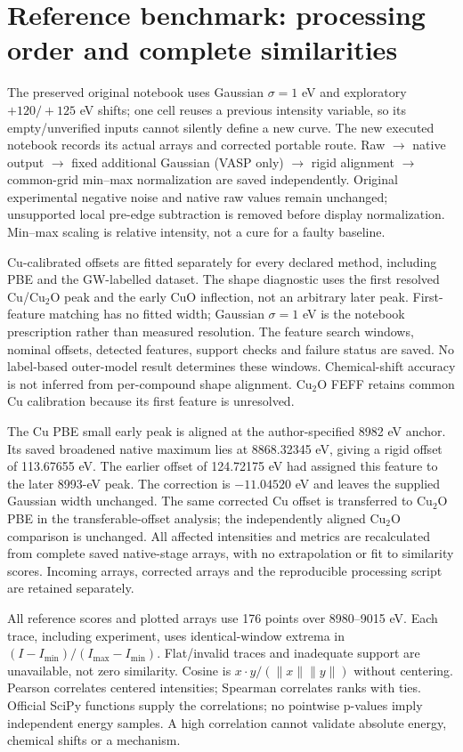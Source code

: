 \documentclass[11pt,a4paper]{article}
\begin{document}
\section{Reference benchmark: processing order and complete similarities}
The preserved original notebook uses Gaussian $\sigma=1$ eV and exploratory $+120/+125$ eV shifts; one cell reuses a previous intensity variable, so its empty/unverified inputs cannot silently define a new curve. The new executed notebook records its actual arrays and corrected portable route. Raw $\rightarrow$ native output $\rightarrow$ fixed additional Gaussian (VASP only) $\rightarrow$ rigid alignment $\rightarrow$ common-grid min--max normalization are saved independently. Original experimental negative noise and native raw values remain unchanged; unsupported local pre-edge subtraction is removed before display normalization. Min--max scaling is relative intensity, not a cure for a faulty baseline.

Cu-calibrated offsets are fitted separately for every declared method, including PBE and the GW-labelled dataset. The shape diagnostic uses the first resolved Cu/Cu$_2$O peak and the early CuO inflection, not an arbitrary later peak. First-feature matching has no fitted width; Gaussian $\sigma=1$ eV is the notebook prescription rather than measured resolution. The feature search windows, nominal offsets, detected features, support checks and failure status are saved. No label-based outer-model result determines these windows. Chemical-shift accuracy is not inferred from per-compound shape alignment. Cu$_2$O FEFF retains common Cu calibration because its first feature is unresolved.

The Cu PBE small early peak is aligned at the author-specified 8982 eV anchor. Its saved broadened native maximum lies at 8868.32345 eV, giving a rigid offset of 113.67655 eV. The earlier offset of 124.72175 eV had assigned this feature to the later 8993-eV peak. The correction is $-11.04520$ eV and leaves the supplied Gaussian width unchanged. The same corrected Cu offset is transferred to Cu$_2$O PBE in the transferable-offset analysis; the independently aligned Cu$_2$O comparison is unchanged. All affected intensities and metrics are recalculated from complete saved native-stage arrays, with no extrapolation or fit to similarity scores. Incoming arrays, corrected arrays and the reproducible processing script are retained separately.

All reference scores and plotted arrays use 176 points over 8980--9015 eV. Each trace, including experiment, uses identical-window extrema in $(I-I_{\min})/(I_{\max}-I_{\min})$. Flat/invalid traces and inadequate support are unavailable, not zero similarity. Cosine is $x\cdot y/(\|x\|\|y\|)$ without centering. Pearson correlates centered intensities; Spearman correlates ranks with ties. Official SciPy functions supply the correlations; no pointwise p-values imply independent energy samples. A high correlation cannot validate absolute energy, chemical shifts or a mechanism.
\end{document}
